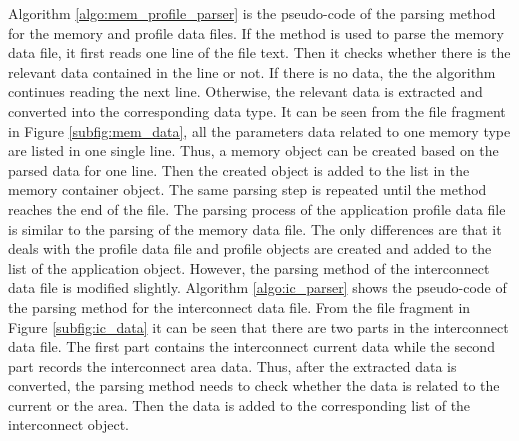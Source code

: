 	
	
	Algorithm \ref{algo:mem_profile_parser} is the pseudo-code of
	the parsing method for the memory and profile data files. If the method is
	used to parse the memory data file, it first reads one line of the file text.
	Then it checks whether there is the relevant data contained in the line or not.
	If there is no data, the the algorithm continues reading the next line.
	Otherwise, the relevant data is extracted and converted into the corresponding
	data type.
	It can be seen from the file fragment in Figure \ref{subfig:mem_data}, all the
	parameters data related to one memory type are listed in one single line.
	Thus, a memory object can be created based on the parsed data
	for one line. Then the created object is added to the list in the memory container
	object. The same parsing step is repeated until the method reaches the end of
	the file. The parsing process of the application profile data file is similar
	to the parsing of the memory data file.
	The only differences are that it deals with the profile data file and
	profile objects are created and added to the list of the application object.
	However, the parsing method of the interconnect data file is modified slightly.
	Algorithm \ref{algo:ic_parser} shows the pseudo-code of the parsing method for
	the interconnect data file.
	From the file fragment in Figure \ref{subfig:ic_data} it can be seen that there
	are two parts in the interconnect data file.
	The first part contains the interconnect current data while the second part
	records the interconnect area data. Thus, after the extracted data is converted,
	the parsing method needs to check whether the data is related to the current or
	the area. Then the data is added to the corresponding list of the interconnect
	object.
	
	
	
